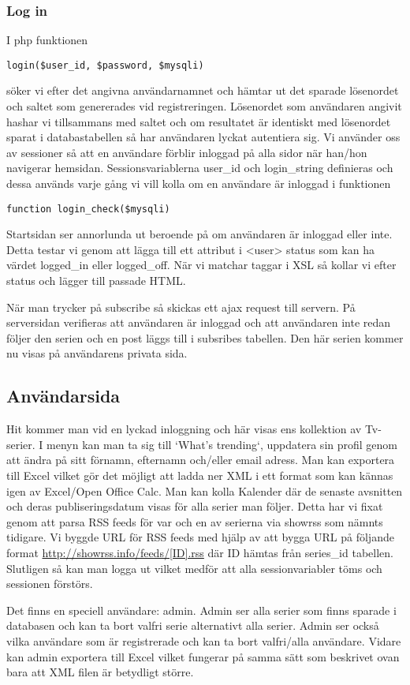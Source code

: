 \subsubsection{Log in}
I php funktionen 
\begin{lstlisting} 
login($user_id, $password, $mysqli)
\end{lstlisting} söker vi efter det angivna användarnamnet och hämtar ut det sparade lösenordet och saltet som genererades vid registreringen. Lösenordet som användaren angivit hashar vi tillsammans med saltet och om resultatet är identiskt med lösenordet sparat i databastabellen så har användaren lyckat autentiera sig. Vi använder oss av sessioner så att en användare förblir inloggad på alla sidor när han/hon navigerar hemsidan. Sessionsvariablerna user\_id och login\_string definieras och dessa används varje gång vi
vill kolla om en användare är inloggad i funktionen 
\begin{lstlisting} 
function login_check($mysqli)
\end{lstlisting}

Startsidan ser annorlunda ut beroende på om användaren är inloggad eller inte. Detta testar vi genom att lägga till ett attribut i <user> status som kan ha värdet logged\_in eller logged\_off. När vi matchar taggar i XSL så kollar vi efter status och lägger till passade HTML.

När man trycker på subscribe så skickas ett ajax request till servern. På serversidan verifieras att användaren är inloggad och att användaren inte redan följer den serien och en post läggs till i subsribes tabellen. Den här serien kommer nu visas på användarens privata sida. 

\subsection{Användarsida}
Hit kommer man vid en lyckad inloggning och här visas ens kollektion av Tv-serier. I menyn kan man ta sig till `What's trending`, uppdatera sin profil genom att ändra på sitt förnamn, efternamn och/eller email adress. Man kan exportera till Excel vilket gör det möjligt att ladda ner XML i ett format som kan kännas igen av Excel/Open Office Calc. Man kan kolla Kalender där de senaste avsnitten och deras publiseringsdatum visas för alla serier man följer. Detta har vi fixat genom att parsa RSS feeds för var och en av serierna via showrss som nämnts tidigare. Vi byggde URL för RSS feeds med hjälp av att bygga URL på följande format \url{http://showrss.info/feeds/[ID].rss} där ID hämtas från series\_id tabellen. Slutligen så kan man logga ut vilket medför att alla sessionvariabler töms och sessionen förstörs. 

Det finns en speciell användare: admin. Admin ser alla serier som finns sparade i databasen och kan ta bort valfri serie alternativt alla serier. Admin ser också vilka användare som är registrerade och kan ta bort valfri/alla användare. Vidare kan admin exportera till Excel vilket fungerar på samma sätt som beskrivet ovan bara att XML filen är betydligt större. 
